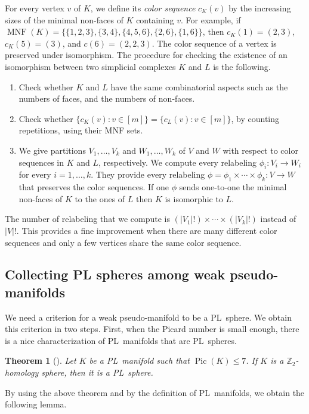 \documentclass[11pt]{amsart}
\theoremstyle{plain}
\newtheorem{theorem}{Theorem}[section]
\numberwithin{equation}{section}
\theoremstyle{definition}
\newcommand{\Z}{\mathbb{Z}}
\DeclareMathOperator{\Pic}{Pic}
\DeclareMathOperator{\MNF}{MNF}
\begin{document}
For every vertex $v$ of $K$, we define its \emph{color sequence} $c_K(v)$ by the increasing sizes of the minimal non-faces of $K$ containing $v$.
For example, if $\MNF(K)=\{\{1,2,3\},\{3,4\},\{4,5,6\},\{2,6\},\{1,6\}\}$, then $c_K(1) = (2,3)$, $c_K(5) = (3)$, and $c(6)=(2,2,3)$.
The color sequence of a vertex is preserved under isomorphism.
The procedure for checking the existence of an isomorphism between two simplicial complexes $K$ and $L$ is the following.
\begin{enumerate}
	\item Check whether $K$ and $L$ have the same combinatorial aspects such as the numbers of faces, and the numbers of non-faces.
	\item Check whether  $\{c_{K}(v)\colon v\in[m]\}=\{c_{L}(v)\colon v\in[m]\}$, by counting repetitions, using their MNF sets.
	\item We give partitions $V_1,\ldots,V_k$ and $W_1,\ldots,W_k$ of $V$ and $W$ with respect to color sequences in $K$ and $L$, respectively.
	We compute every relabeling $\phi_i\colon V_i\to W_i$ for every $i=1,\ldots,k$.
	They provide every relabeling $\phi = \phi_1\times\cdots\times \phi_k\colon V\to W$ that preserves the color sequences.
	If one $\phi$ sends one-to-one the minimal non-faces of $K$ to the ones of $L$ then $K$ is isomorphic to $L$.
\end{enumerate}
The number of relabeling that we compute is $(|V_1|!)\times\cdots\times(|V_k|!)$ instead of $|V|!$.
This provides a fine improvement when there are many different color sequences and only a few vertices share the same color sequence.

\subsection{Collecting PL spheres among weak pseudo-manifolds} \label{subsection:PL_sphere}
We need a criterion for a weak pseudo-manifold to be a PL~sphere.
We obtain this criterion in two steps.
First, when the Picard number is small enough, there is a nice characterization of PL~manifolds that are PL~spheres.

\begin{theorem}[\cite{Bagchi2005}]
	\label{theorem:combisp}
	Let $K$ be a PL~manifold such that $\Pic(K) \leq 7$.
	If $K$ is a $\Z_2$-homology sphere, then it is a PL~sphere.
\end{theorem}

By using the above theorem and by the definition of PL~manifolds, we obtain the following lemma.
\end{document}
